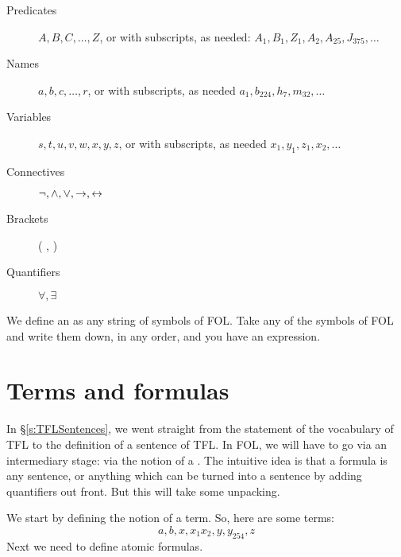 \begin{description}
\item[Predicates] $A,B,C,\ldots,Z$, or 
with subscripts, as needed: $A_1, B_1,Z_1,A_2,A_{25},J_{375},\ldots$
\item[Names] $a,b,c,\ldots, r$, or
with subscripts, as needed $a_1, b_{224}, h_7, m_{32},\ldots$
\item[Variables] $s, t, u, v, w, x,y,z$, or
with subscripts, as needed $x_1, y_1, z_1, x_2,\ldots$
\item[Connectives]  $\neg,\wedge,\vee,\rightarrow,\leftrightarrow$
\item[Brackets] ( , )
\item[Quantifiers]  $\forall, \exists$
\end{description}
We define an  as any string of symbols of FOL. Take any of the symbols of FOL and write them down, in any order, and you have an expression.

\section{Terms and formulas}
\label{s:TermsFormulas}

In \S\ref{s:TFLSentences}, we went straight from the statement of the vocabulary of TFL to the definition of a sentence of TFL. In FOL, we will have to go via an intermediary stage: via the notion of a . The intuitive idea is that a formula is any sentence, or anything which can be turned into a sentence by adding quantifiers out front. But this will take some unpacking.

We start by defining the notion of a term.
So, here are some terms:
	$$a, b, x, x_1 x_2, y, y_{254}, z$$
Next we need to define atomic formulas.


